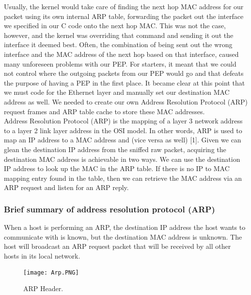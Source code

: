 \documentclass{uathesis}
\begin{document}
Usually, the kernel would take care of finding the next hop MAC address for our packet using its own internal ARP table, forwarding the packet out the interface we specified in our C code onto the next hop MAC. This was not the case, however, and the kernel was overriding that command and sending it out the interface it deemed best. Often, the combination of being sent out the wrong interface and the MAC address of the next hop based on that interface, caused many unforeseen problems with our PEP. For starters, it meant that we could not control where the outgoing packets from our PEP would go and that defeats the purpose of having a PEP in the first place. It became clear at this point that we must code for the Ethernet layer and manually set our destination MAC address as well. We needed to create our own Address Resolution Protocol (ARP) request frames and ARP table cache to store these MAC addresses. \\

Address Resolution Protocol (ARP) is the mapping of a layer 3 network address to a layer 2 link layer address in the OSI model. In other words, ARP is used to map an IP address to a MAC address and (vice versa as well) [1]. Given we can glean the destination IP address from the sniffed raw packet, acquiring the destination MAC address is achievable in two ways. We can use the destination IP address to look up the MAC in the ARP table. If there is no IP to MAC mapping entry found in the table, then we can retrieve the MAC address via an ARP request and listen for an ARP reply. 

\subsubsection{Brief summary of address resolution protocol (ARP)}
When a host is performing an ARP, the destination IP address the host wants to communicate with is known, but the destination MAC address is unknown. The host will broadcast an ARP request packet that will be received by all other hosts in its local network. \\

\begin{figure}[h!]
    \centering
    \texttt{[image: Arp.PNG]}
    \caption{ARP Header. }
    \label{fig:ARP Header}
\end{figure}
\end{document}
